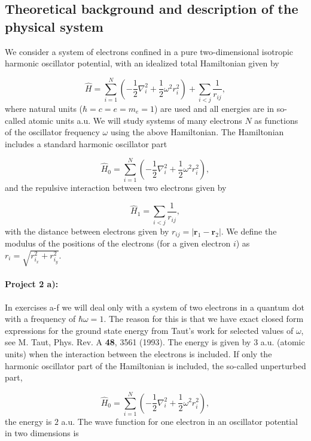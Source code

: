 \documentclass[%
oneside,                 %
final,                   %
10pt]{article}
\begin{document}
\subsection{Theoretical background and description of the physical system}

We consider a system of electrons confined in a pure two-dimensional 
isotropic harmonic oscillator potential, with an idealized  total Hamiltonian given by

\begin{equation}
\label{eq:finalH}
\hat{H}=\sum_{i=1}^{N} \left(  -\frac{1}{2} \nabla_i^2 + \frac{1}{2} \omega^2r_i^2  \right)+\sum_{i<j}\frac{1}{r_{ij}},
\end{equation}
where natural units ($\hbar=c=e=m_e=1$) are used and all energies are in so-called atomic units a.u. We will study systems of many electrons $N$ as functions of the oscillator frequency  $\omega$ using the above Hamiltonian.  The Hamiltonian includes a standard harmonic oscillator part

\begin{equation*}
\hat{H}_0=\sum_{i=1}^{N} \left(  -\frac{1}{2} \nabla_i^2 + \frac{1}{2} \omega^2r_i^2  \right),
\end{equation*}
and the repulsive interaction between two electrons given by

\begin{equation*}
\hat{H}_1=\sum_{i<j}\frac{1}{r_{ij}},
\end{equation*}
with the distance between electrons given by $r_{ij}=\vert \bm{r}_1-\bm{r}_2\vert$. We define the 
modulus of the positions of the electrons (for a given electron $i$) as $r_i = \sqrt{r_{i_x}^2+r_{i_y}^2}$.

\paragraph{Project 2 a):}
In exercises a-f we will deal only with a system of
two electrons in a quantum dot with a frequency of $\hbar\omega = 1$. 
The reason for this is that we have exact closed form expressions 
for the ground state energy from Taut's work for selected values of $\omega$, 
see M. Taut, Phys. Rev. A \textbf{48}, 3561 (1993).
The energy is given by $3$ a.u.  (atomic units) when the interaction between the electrons is included.
If only the harmonic oscillator part of the Hamiltonian is included,
the so-called unperturbed part,

\begin{equation*} \hat{H}_0=\sum_{i=1}^{N} \left(  -\frac{1}{2} \nabla_i^2 + \frac{1}{2} \omega^2r_i^2  \right),\end{equation*}
the energy is $2$ a.u.
The wave function for one electron in an oscillator potential in two dimensions is
\end{document}
